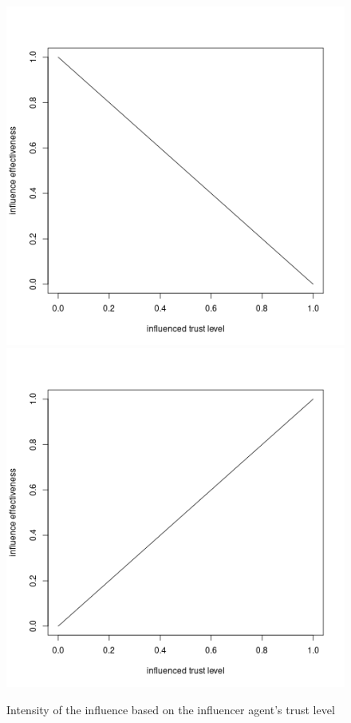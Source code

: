\begin{figure}[!htb]
        \caption{Intensity of the influence based on the influencer agent's trust level}
        \label{fig:influence_intensity}
    \endminipage
    \\
    \minipage{\textwidth}
        \centering
            \includegraphics[width=\linewidth]{pics/influence_effectiveness_below.png}
        \endminipage
        \hspace{0.2in}
            \includegraphics[width=\linewidth]{pics/influence_effectiveness_above.png}

\end{figure}
